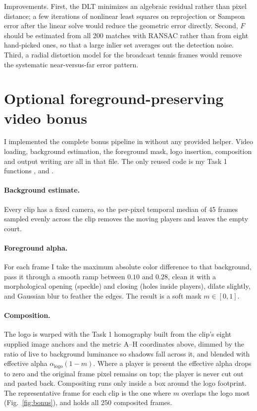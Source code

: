 \documentclass[11pt]{article}
\begin{document}
Improvements. First, the DLT minimizes an algebraic residual rather than pixel
distance; a few iterations of nonlinear least squares on reprojection or
Sampson error after the linear solve would reduce the geometric error directly.
Second, $F$ should be estimated from all 200 matches with RANSAC rather than
from eight hand-picked ones, so that a large inlier set averages out the
detection noise. Third, a radial distortion model for the broadcast tennis
frames would remove the systematic near-versus-far error pattern.

\section*{Optional foreground-preserving video bonus}

I implemented the complete bonus pipeline in 
without any provided helper. Video loading, background estimation, the
foreground mask, logo insertion, composition and output writing are all in that
file. The only reused code is my Task 1 functions ,
 and .

\paragraph{Background estimate.} Every clip has a fixed camera, so the per-pixel temporal
median of 45 frames sampled evenly across the clip removes the moving players
and leaves the empty court.

\paragraph{Foreground alpha.} For each frame I take the maximum absolute color difference
to that background, pass it through a smooth ramp between $0.10$ and $0.28$,
clean it with a morphological opening (speckle) and closing (holes inside
players), dilate slightly, and Gaussian blur to feather the edges. The result is
a soft mask $m\in[0,1]$.

\paragraph{Composition.} The logo is warped with the Task 1 homography built from the clip's
eight supplied image anchors and the metric A--H coordinates above, dimmed by
the ratio of live to background luminance so shadows fall across it, and blended
with effective alpha $\alpha_\text{logo}(1-m)$. Where a player is present the
effective alpha drops to zero and the original frame pixel remains on top; the
player is never cut out and pasted back. Compositing runs only inside a box
around the logo footprint. The representative frame for each clip is the one
where $m$ overlaps the logo most (Fig.~\ref{fig:bonus}), and
 holds all 250 composited frames.
\end{document}
